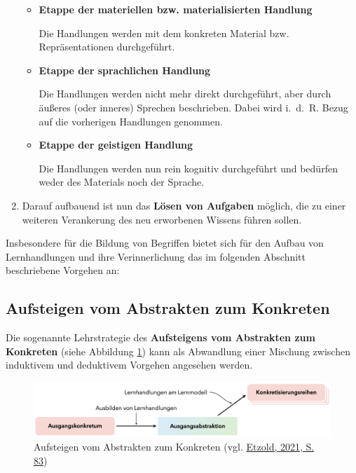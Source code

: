 \documentclass[
  ngerman,
]{scrbook}
\theoremstyle{definition}
\theoremstyle{definition}
\theoremstyle{definition}
\theoremstyle{definition}
\theoremstyle{remark}
\begin{document}
\begin{enumerate}
  \begin{itemize}
  \item
    \textbf{Etappe der materiellen bzw. materialisierten Handlung}

    Die Handlungen werden mit dem konkreten Material bzw. Repräsentationen durchgeführt.
  \item
    \textbf{Etappe der sprachlichen Handlung}

    Die Handlungen werden nicht mehr direkt durchgeführt, aber durch äußeres (oder inneres) Sprechen beschrieben. Dabei wird i.~d.~R. Bezug auf die vorherigen Handlungen genommen.
  \item
    \textbf{Etappe der geistigen Handlung}

    Die Handlungen werden nun rein kognitiv durchgeführt und bedürfen weder des Materials noch der Sprache.
  \end{itemize}
\item
  Darauf aufbauend ist nun das \textbf{Lösen von Aufgaben} möglich, die zu einer weiteren Verankerung des neu erworbenen Wissens führen sollen.
\end{enumerate}

Insbesondere für die Bildung von Begriffen bietet sich für den Aufbau von Lernhandlungen und ihre Verinnerlichung das im folgenden Abschnitt beschriebene Vorgehen an:

\hypertarget{aufsteigen-vom-abstrakten-zum-konkreten}{%
\subsection{Aufsteigen vom Abstrakten zum Konkreten}\label{aufsteigen-vom-abstrakten-zum-konkreten}}

Die sogenannte Lehrstrategie des \textbf{Aufsteigens vom Abstrakten zum Konkreten} (siehe Abbildung \ref{fig:Aufsteigen}) kann als Abwandlung einer Mischung zwischen induktivem und deduktivem Vorgehen angesehen werden.



\begin{figure}

{\centering \includegraphics[width=1\linewidth]{pictures/7-AK} 

}

\caption{Aufsteigen vom Abstrakten zum Konkreten (vgl. \protect\hyperlink{ref-Etzold2021}{Etzold, 2021, S. 83})}\label{fig:Aufsteigen}
\end{figure}
\end{document}
